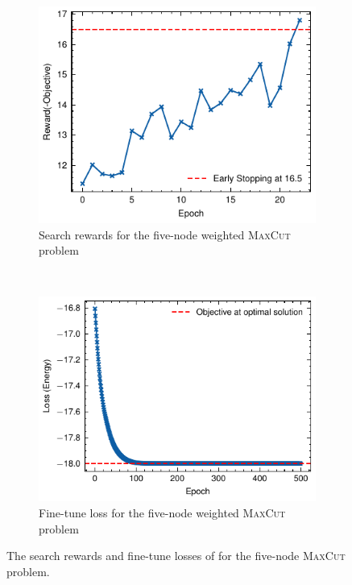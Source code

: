 \documentclass[a4paper,onecolumn,11pt]{quantumarticle}
\begin{document}
\begin{figure}[H]
    \centering
    \begin{subfigure}[b]{0.46\textwidth}
        \includegraphics[width=\textwidth]{Figures/fig_qaoa_5q_1_search_rewards.pdf}
        \caption{Search rewards for the five-node weighted \textsc{MaxCut} problem}
        \label{fig:qaoa_5q_search}
    \end{subfigure}
    ~ %
    \begin{subfigure}[b]{0.48\textwidth}
        \includegraphics[width=\textwidth]{Figures/fig_qaoa_5q_1_fine_tune_loss.pdf}
        \caption{Fine-tune loss for the five-node weighted \textsc{MaxCut} problem}
        \label{fig:qaoa_5q_finetune}
    \end{subfigure}
    \caption{The search rewards and fine-tune losses of for the five-node \textsc{MaxCut} problem.}\label{fig:qaoa_5q_search_and_finetune}
\end{figure}
\end{document}
